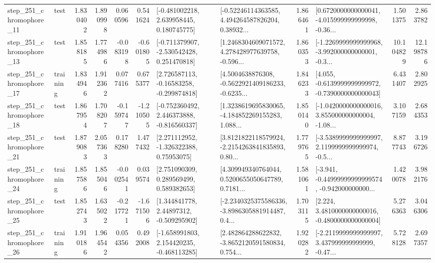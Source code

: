 \begin{tabular}{llrrrrllrlrr}
  step\_251\_chromophore\_11 &      test &      1.830402 &    1.890998 &      0.060596 &  0.541624 &    [-0.481002218, 2.639958445, 0.180745775] &  [-0.52246114363585, 4.494264587826204, 0.38932... &       1.866461 &  [0.6720000000000041, -4.015999999999998, -0.36... &            1.501375 &          2.863782 \\
  step\_251\_chromophore\_13 &      test &      1.858185 &    1.774986 &     -0.083198 & -0.601805 &   [-0.711379907, -2.530542428, 0.251470818] &  [1.2468304609071572, 4.278428977639758, -0.596... &       1.860353 &  [-1.2269999999999968, -3.992000000000001, -0.3... &           10.104829 &         12.198786 \\
  step\_251\_chromophore\_17 &  training &      1.834946 &    1.912362 &      0.077416 &  0.675377 &    [2.726587113, -0.16583258, -0.299874818] &  [4.5004638876308, -0.5622921409186233, -0.6235... &       1.846233 &  [4.055, -0.6139999999999972, -0.7390000000000043] &            6.431407 &          2.802925 \\
  step\_251\_chromophore\_18 &      test &      1.867954 &    1.708207 &     -0.159747 & -1.210505 &   [-0.752360492, 2.446373888, -0.816560337] &  [1.3238619695830065, -4.184852269155283, 1.088... &       1.850140 &  [-1.0420000000000016, 3.855000000000004, -1.08... &            3.107159 &          2.684353 \\
  step\_251\_chromophore\_21 &      test &      1.879083 &    2.057363 &      0.178280 &  1.477432 &     [2.271112952, -1.326322388, 0.75953075] &  [3.8121822118579924, -2.2154263841835893, 0.80... &       1.779765 &  [-3.5389999999999997, 2.1199999999999974, -0.5... &            8.877743 &          3.196726 \\
  step\_251\_chromophore\_24 &  training &      1.857586 &    1.855046 &     -0.002541 &  0.039574 &     [2.751090309, 0.289569499, 0.589382653] &  [4.309949340764044, 0.5200655050647789, 0.7181... &       1.581061 &  [-3.941, -0.44999999999999574, -0.942000000000... &            1.420078 &          3.982176 \\
  step\_251\_chromophore\_25 &      test &      1.852743 &    1.635022 &     -0.217721 & -1.671506 &     [1.344841778, 2.44897312, -0.509295902] &  [-2.2340325375586336, -3.8986305881914487, 0.4... &       1.703115 &   [2.224, 3.4810000000000016, -0.4800000000000004] &            5.276363 &          3.046306 \\
  step\_251\_chromophore\_26 &  training &      1.910186 &    1.964542 &      0.054356 &  0.492008 &   [-1.658991803, 2.154420235, -0.468113285] &  [2.482864288622832, -3.8652120591580834, 0.754... &       1.920282 &  [-2.2119999999999997, 3.437999999999999, -0.47... &            5.728128 &          2.697357 \\

\end{tabular}
